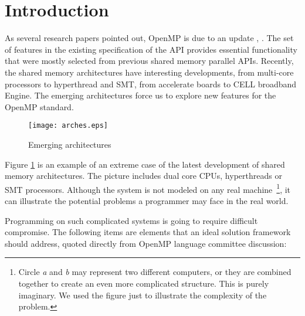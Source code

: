 \section{Introduction}
\label{introduction}

As several research papers pointed out, OpenMP 
\cite{Ope05} is due to an update \cite{Gon00}, \cite{Cha05}. The set of
features in the existing specification of the API provides essential
functionality that were mostly selected from previous shared memory parallel
APIs. Recently, the shared memory architectures have interesting developments,
from multi-core processors to hyperthread and SMT, from accelerate boards to
CELL broadband Engine\cite{Cel05}. The emerging architectures force us to
explore new features for the OpenMP standard. 


\begin{figure}[h!]
  \begin{center}
    \texttt{[image: arches.eps]}
    \caption{\footnotesize Emerging architectures}
    \label{fig:arches}
  \end{center}
\end{figure}

Figure \ref{fig:arches} is an example of an extreme case of the latest development
of shared memory architectures. The picture includes dual core CPUs,
hyperthreads or SMT processors. Although the system is not modeled on any real
machine~\footnote{Circle \emph{a} and \emph{b} may represent two different
computers, or they are combined together to create an even more complicated
structure. This is purely imaginary. We used the figure just to illustrate the
complexity of the problem.}, it can illustrate the potential problems a
programmer may face in the real world.

Programming on such complicated systems is going to require difficult
compromise. The following items are elements that an ideal solution framework
should address, quoted directly from OpenMP language committee discussion:

